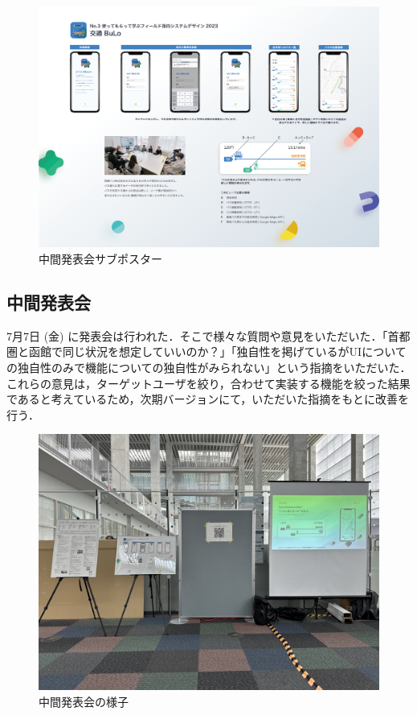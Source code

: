 \begin{figure}[H]
    \centering
    \includegraphics[width=14cm]{images/interim_poster_bulo.png}
    \caption{中間発表会サブポスター}
    \label{fig:interim_poster_bulo}
\end{figure}

\subsection{中間発表会}
7月7日 (金) に発表会は行われた．そこで様々な質問や意見をいただいた．「首都圏と函館で同じ状況を想定していいのか？」「独自性を掲げているがUIについての独自性のみで機能についての独自性がみられない」という指摘をいただいた．これらの意見は，ターゲットユーザを絞り，合わせて実装する機能を絞った結果であると考えているため，次期バージョンにて，いただいた指摘をもとに改善を行う．

\begin{figure}[H]
    \centering
    \includegraphics[width=12cm]{images/mid_presentation.png}
    \caption{中間発表会の様子}
    \label{fig:mid_presentation}
\end{figure}

